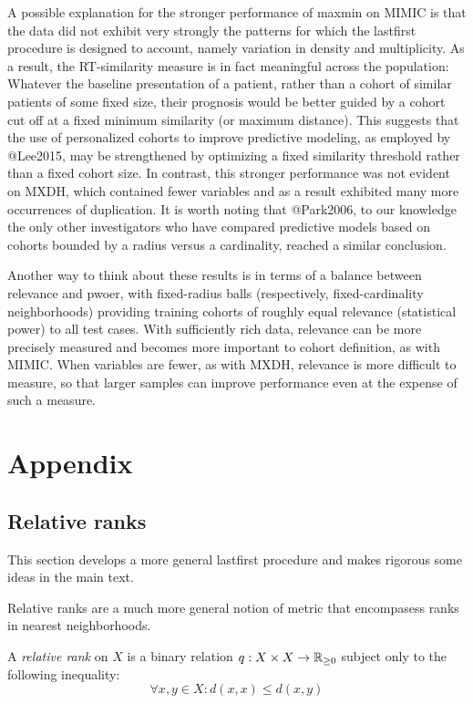 \documentclass[
]{article}
\begin{document}
A possible explanation for the stronger performance of maxmin on MIMIC
is that the data did not exhibit very strongly the patterns for which
the lastfirst procedure is designed to account, namely variation in
density and multiplicity. As a result, the RT-similarity measure is in
fact meaningful across the population: Whatever the baseline
presentation of a patient, rather than a cohort of similar patients of
some fixed size, their prognosis would be better guided by a cohort cut
off at a fixed minimum similarity (or maximum distance). This suggests
that the use of personalized cohorts to improve predictive modeling, as
employed by @Lee2015, may be strengthened by optimizing a fixed
similarity threshold rather than a fixed cohort size. In contrast, this
stronger performance was not evident on MXDH, which contained fewer
variables and as a result exhibited many more occurrences of
duplication. It is worth noting that @Park2006, to our knowledge the
only other investigators who have compared predictive models based on
cohorts bounded by a radius versus a cardinality, reached a similar
conclusion.

Another way to think about these results is in terms of a balance
between relevance and pwoer, with fixed-radius balls (respectively,
fixed-cardinality neighborhoods) providing training cohorts of roughly
equal relevance (statistical power) to all test cases. With sufficiently
rich data, relevance can be more precisely measured and becomes more
important to cohort definition, as with MIMIC. When variables are fewer,
as with MXDH, relevance is more difficult to measure, so that larger
samples can improve performance even at the expense of such a measure.

\hypertarget{appendix}{%
\section{Appendix}\label{appendix}}

\hypertarget{relative-ranks}{%
\subsection{Relative ranks}\label{relative-ranks}}

This section develops a more general lastfirst procedure and makes
rigorous some ideas in the main text.

Relative ranks are a much more general notion of metric that encompasess
ranks in nearest neighborhoods.

\begin{definition}
    A \emph{relative rank} on $X$ is a binary relation $q: X \times X \to \mathbb{R}_{\geq 0}$ subject only to the following inequality:
    \begin{equation}\label{eqn:relative-rank}
        \forall x,y \in X : d(x,x) \leq d(x,y)
    \end{equation}
\end{definition}
\end{document}
